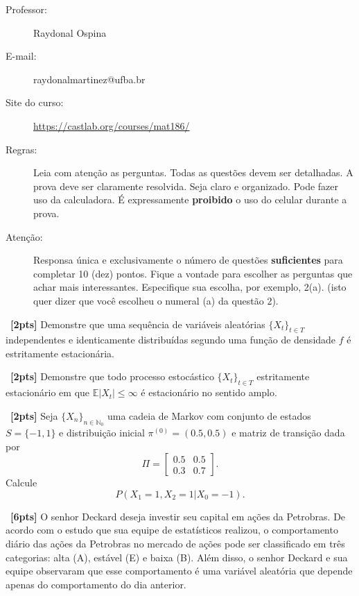 \documentclass[a4paper,12pt,oneside,twocolumn]{Config/milktest}
\begin{document}
\beb
{
\begin{description}
\item[Professor:] Raydonal Ospina
\item[E-mail:] raydonalmartinez@ufba.br
\item[Site do curso:] \url{https://castlab.org/courses/mat186/}

\item[Regras:] Leia com atenção as perguntas. Todas as questões devem ser detalhadas. A prova deve ser claramente resolvida. Seja claro e organizado. Pode fazer uso da calculadora. É expressamente {\bf proibido} o uso do celular durante a prova.

\item[Atenção:] Responsa única e exclusivamente o número de questões {\bf suficientes} para completar 10 (dez) pontos.  Fique a vontade para escolher as perguntas que achar mais interessantes. Especifique sua escolha, por exemplo, 2(a). (isto quer dizer que você escolheu  o numeral (a) da questão 2).
\end{description}
}
\eeb

\balance

\medskip 
\question~\textbf{[2pts]}  
Demonstre que uma sequência de variáveis aleatórias $\{X_t\}_{t\in T}$ independentes e identicamente distribuídas segundo uma função de densidade $f$ é estritamente estacionária.

\medskip 
\question~\textbf{[2pts]}  
Demonstre que todo processo estocástico $\{X_t\}_{t\in T}$ estritamente estacionário em que $\mathbb{E}|X_t|\leq \infty$ é estacionário  no sentido amplo. 

\medskip 
\question~\textbf{[2pts]}  
Seja $\{X_n\}_{n\in \mathbb{N}_0}$ uma cadeia de Markov com conjunto de estados $S=\{-1,1\}$ e distribuição inicial $\pi^{(0)}= (0.5, 0.5)$ e matriz de transição dada por $$
\Pi = \begin{bmatrix}
0.5 & 0.5 \\
0.3 & 0.7
\end{bmatrix}.
$$
Calcule $$P(X_1=1, X_2=1|X_0=-1 ).$$

\medskip 
\question~\textbf{[6pts]} 
O senhor Deckard deseja investir seu capital em ações da  Petrobras.  De acordo com o estudo que sua equipe de estatísticos realizou, o comportamento diário das ações da  Petrobras  no mercado de ações pode ser classificado em três categorias: alta (A), estável (E) e baixa (B). Além disso, o senhor Deckard e sua equipe observaram que esse comportamento é uma variável aleatória que depende apenas do comportamento do dia anterior. 
\end{document}
